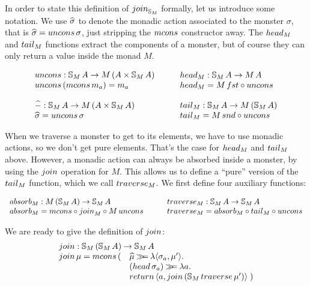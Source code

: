 In order to state this definition of $\join_{\stream{M}}$ formally, let us introduce some notation.
We use $\widehat{\sigma}$ to denote the monadic action associated to the monster $\sigma$, that is $ \unc{\sigma} = \uncons\,\sigma $, just stripping the $\mcons$ constructor away.
The $\head_M$ and $\tail_M$ functions extract the components of a monster, but of course they can only return a value inside the monad $M$.

$$
\begin{array}{l}
\uncons : \stream{M}\,A \rightarrow M\,(A \times \stream{M}\,A)\\
\uncons\, (\mcons\, m_a) = m_a \\
\,\\
\unc{-} : \stream{M}\,A \rightarrow M\,(A\times \stream{M}\,A)\\
\unc{\sigma} = \uncons\,\sigma
\end{array}
\qquad
\begin{array}{l}
\head_M : \stream{M}\,A \rightarrow M\,A\\
\head_M = M\,\fst \comp \uncons\\
\,\\
\tail_M : \stream{M}\,A \rightarrow M\,(\stream{M}\,A)\\
\tail_M = M\,\snd \comp \uncons\\
\end{array}
$$

When we traverse a monster to get to its elements, we have to use monadic actions, so we don't get pure elements.
That's the case for $\head_M$ and $\tail_M$ above.
However, a monadic action can always be absorbed inside a monster, by using the $\join$ operation for $M$.
This allows us to define a ``pure'' version of the $\tail_M$ function, which we call $\traverse_M$.
We first define four auxiliary functions:

$$
\begin{array}{l}
\absorb_M : M\,(\stream{M}\,A) \rightarrow \stream{M}\,A \\
\absorb_M =  \mcons \comp \join_{M} \comp M\,\uncons
\end{array}
  \qquad
\begin{array}{l}
\traverse_M : \stream{M}\,A \rightarrow \stream{M}\,A \\
\traverse_M = \absorb_M \comp \tail_M \comp \uncons
\end{array}
$$

We are ready to give the definition of $\join$:
$$
\begin{array}{ll}
\multicolumn{2}{l}{\join: \stream{M}\,(\stream{M}\,A) \rightarrow \stream{M}\,A}\\
\join\,\mu = \mcons\,(
  & \unc{\mu} \bind
    \lambda \pair{\sigma_a}{\mu'}.\\
  &  (\head\,\sigma_a) \bind \lambda a.\\
  & \return\,\pair{a}{\join\,(\stream{M}\,\traverse\, \mu')} \; )
\end{array}
$$

